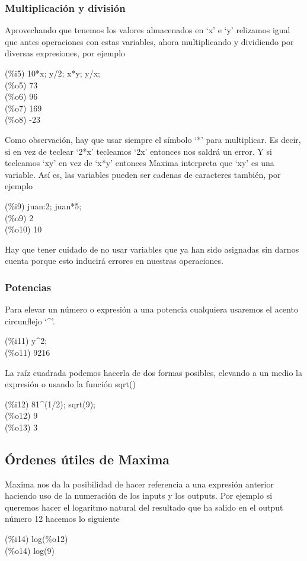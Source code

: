 \documentclass[a4paper, 12pt] {article}
\begin{document}
\subsubsection{Multiplicación y división}
Aprovechando que tenemos los valores almacenados en `x' e `y' relizamos igual que antes operaciones con estas variables, ahora multiplicando y dividiendo por diversas expresiones, por ejemplo
\begin{center}
  (\%i5) 10*x; y/2; x*y; y/x; \\(\%o5) 73 \\(\%o6) 96 \\(\%o7) 169 \\(\%o8) -23
\end{center}
Como observación, hay que usar siempre el símbolo `*' para multiplicar. Es decir, si en vez de teclear `2*x' tecleamos `2x' entonces nos saldrá un error. Y si tecleamos `xy' en vez de `x*y' entonces Maxima interpreta que `xy' es una variable. Así es, las variables pueden ser cadenas de caracteres también, por ejemplo
\begin{center}
    (\%i9) juan:2; juan*5;\\(\%o9) 2\\(\%o10) 10
\end{center}
Hay que tener cuidado de no usar variables que ya han sido asignadas sin darnos cuenta porque esto inducirá errores en nuestras operaciones.
\pagebreak
\subsubsection{Potencias}
Para elevar un número o expresión a una potencia cualquiera usaremos el acento circunflejo `\^{}'.
\begin{center}
    (\%i11) y\^{}2;\\(\%o11) 9216
\end{center}
La raíz cuadrada podemos hacerla de dos formas posibles, elevando a un medio la expresión o usando la función sqrt()
\begin{center}
    (\%i12) 81\^{}(1/2); sqrt(9);\\(\%o12) 9\\(\%o13) 3
\end{center}

\subsection{Órdenes útiles de Maxima}
Maxima nos da la posibilidad de hacer referencia a una expresión anterior haciendo uso de la numeración de los inputs y los outputs. Por ejemplo si queremos hacer el logaritmo natural del resultado que ha salido en el output número 12 hacemos lo siguiente
\begin{center}
    (\%i14) log(\%o12)\\(\%o14) log(9)
\end{center}
\end{document}
